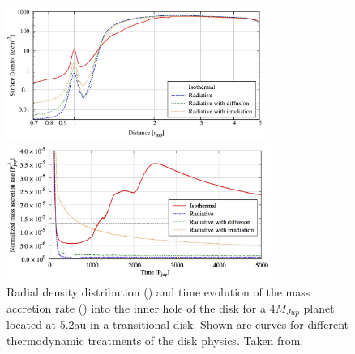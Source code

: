 \documentclass[10pt,fleqn,twoside]{article}
\begin{document}
\begin{figure}[t]
\centerline{\includegraphics[width=0.75\textwidth]{pics/mueller-kley-2013-fig29.jpg}}
\centerline{\includegraphics[width=0.77\textwidth]{pics/mdot-time-4MJup.jpg}}
\caption{\label{fig:ecc-mdot-time} Radial density distribution () and time evolution of the mass accretion rate () into the inner hole of the disk for a $4 M_{Jup}$ planet located
  at 5.2au in a transitional disk.  Shown are curves for different
  thermodynamic treatments of the disk physics.  Taken from:
  \citet{2013A&A...560A..40M}}
\end{figure}
%
\end{document}
